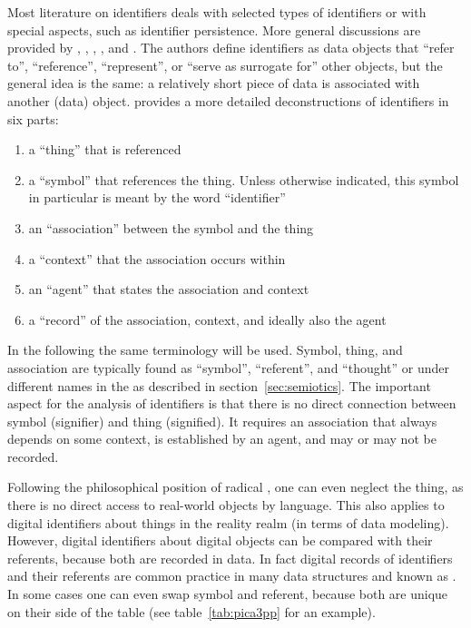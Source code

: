 Most literature on identifiers deals with selected types of identifiers
or with special aspects, such as identifier persistence. More general 
discussions are provided by 
\textcite{Eriksson2010}, %
\textcite{Campbell2007} %
\textcite{Coyle2006}, 
\textcite{Vitiello2004}, 
\textcite{Lynch1997},
and \textcite{Kent1991}. The authors define identifiers as data objects that
``refer to'', ``reference'', ``represent'', or ``serve as surrogate for'' 
other objects, but the general idea is the same: a relatively short
piece of data is associated with another (data) object. 
\textcite{Campbell2007} 
provides a more detailed deconstructions of identifiers in six parts:

\begin{enumerate}
\item a ``thing'' that is referenced
\item a ``symbol'' that references the thing. Unless otherwise indicated,
  this symbol in particular is meant by the word ``identifier''
\item an ``association'' between the symbol and the thing
\item a ``context'' that the association occurs within
\item an ``agent'' that states the association and context
\item a ``record'' of the association, context, and ideally also the agent
\end{enumerate}

In the following the same terminology will be used. Symbol, thing, and
association are typically found as ``symbol'', ``referent'', and ``thought'' or
under different names in the  \cite{Ogden1923} as
described in section~\ref{sec:semiotics}.  The important aspect for the
analysis of identifiers is that there is no direct connection between symbol
(signifier) and thing (signified).  It requires an association that always
depends on some context, is established by an agent, and may or may not be
recorded.

Following the philosophical position of radical 
\cite{Glasersfeld1990}, one can even neglect the thing, as there is no direct
access to real-world objects by language. This also applies to digital
identifiers about things in the reality realm (in terms of data modeling).
However, digital identifiers about digital objects can be compared with their
referents, because both are recorded in data. In fact digital records of
identifiers and their referents are common practice in many data structures and
known as . In some cases one can even swap
symbol and referent, because both are unique on their side of the table (see
table~\ref{tab:pica3pp} for an example).

